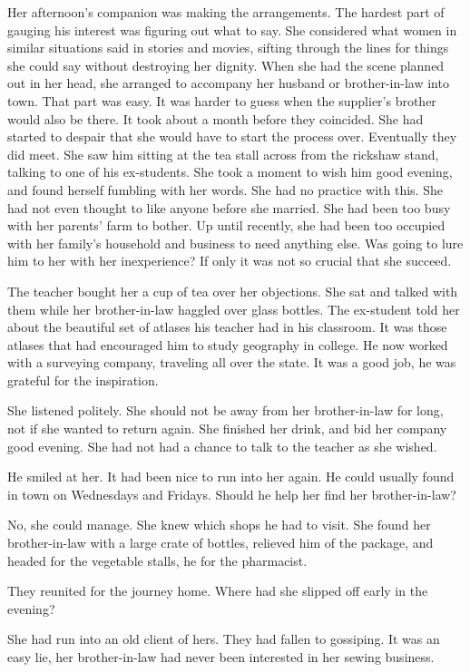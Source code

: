 \documentclass{article}
\begin{document}
Her afternoon's companion was making the arrangements. The hardest part of gauging his interest was figuring out what to say. She considered what women in similar situations said in stories and movies, sifting through the lines for things she could say without destroying her dignity. When she had the scene planned out in her head, she arranged to accompany her husband or brother-in-law into town. That part was easy. It was harder to guess when the supplier's brother would also be there. It took about a month before they coincided. She had started to despair that she would have to start the process over. Eventually they did meet. She saw him sitting at the tea stall across from the rickshaw stand, talking to one of his ex-students. She took a moment to wish him good evening, and found herself fumbling with her words. She had no practice with this. She had not even thought to like anyone before she married. She had been too busy with her parents' farm to bother. Up until recently, she had been too occupied with her family's household and business to need anything else. Was going to lure him to her with her inexperience? If only it was not so crucial that she succeed. 

The teacher bought her a cup of tea over her objections. She sat and talked with them while her brother-in-law haggled over glass bottles. The ex-student told her about the beautiful set of atlases his teacher had in his classroom. It was those atlases that had encouraged him to study geography in college. He now worked with a surveying company, traveling all over the state. It was a good job, he was grateful for the inspiration. 

She listened politely. She should not be away from her brother-in-law for long, not if she wanted to return again. She finished her drink, and bid her company good evening. She had not had a chance to talk to the teacher as she wished.

He smiled at her. It had been nice to run into her again. He could usually found in town on Wednesdays and Fridays. Should he help her find her brother-in-law?

No, she could manage. She knew which shops he had to visit. She found her brother-in-law with a large crate of bottles, relieved him of the package, and headed for the vegetable stalls, he for the pharmacist. 

They reunited for the journey home. Where had she slipped off early in the evening?

She had run into an old client of hers. They had fallen to gossiping. It was an easy lie, her brother-in-law had never been interested in her sewing business. 
\end{document}
